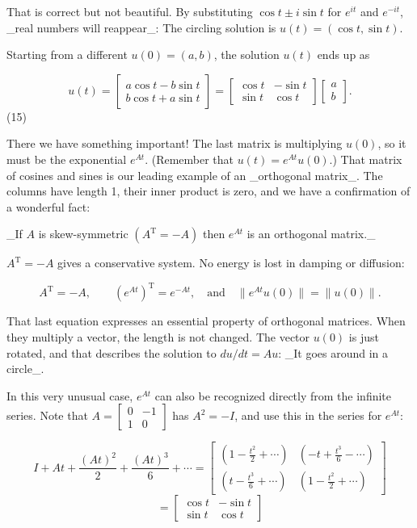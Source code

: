 That is correct but not beautiful. By substituting \(\cos t\pm i\sin t\) for \(e^{it}\) and \(e^{-it}\), _real numbers will reappear_: The circling solution is \(u(t)=(\cos t,\sin t)\).

Starting from a different \(u(0)=(a,b)\), the solution \(u(t)\) ends up as

\[u(t)=\begin{bmatrix}a\cos t-b\sin t\\ b\cos t+a\sin t\end{bmatrix}=\begin{bmatrix}\cos t&-\sin t\\ \sin t&\cos t\end{bmatrix}\begin{bmatrix}a\\ b\end{bmatrix}.\] (15)

There we have something important! The last matrix is multiplying \(u(0)\), so it must be the exponential \(e^{At}\). (Remember that \(u(t)=e^{At}u(0)\).) That matrix of cosines and sines is our leading example of an _orthogonal matrix_. The columns have length 1, their inner product is zero, and we have a confirmation of a wonderful fact:

_If \(A\) is skew-symmetric \((A^{\mathrm{T}}=-A)\) then \(e^{At}\) is an orthogonal matrix._

\(A^{\mathrm{T}}=-A\) gives a conservative system. No energy is lost in damping or diffusion:

\[A^{\mathrm{T}}=-A,\qquad(e^{At})^{\mathrm{T}}=e^{-At},\quad\text{and}\quad \|e^{At}u(0)\|=\|u(0)\|.\]

That last equation expresses an essential property of orthogonal matrices. When they multiply a vector, the length is not changed. The vector \(u(0)\) is just rotated, and that describes the solution to \(du/dt=Au\): _It goes around in a circle_.

In this very unusual case, \(e^{At}\) can also be recognized directly from the infinite series. Note that \(A=\begin{bmatrix}0&-1\\ 1&0\end{bmatrix}\) has \(A^{2}=-I\), and use this in the series for \(e^{At}\):

\[I+At+\frac{(At)^{2}}{2}+\frac{(At)^{3}}{6}+\cdots =\begin{bmatrix}\left(1-\frac{t^{2}}{2}+\cdots\right)&\left(-t+ \frac{t^{3}}{6}-\cdots\right)\\ \left(t-\frac{t^{3}}{6}+\cdots\right)&\left(1-\frac{t^{2}}{2}+\cdots\right) \end{bmatrix}\] \[=\begin{bmatrix}\cos t&-\sin t\\ \sin t&\cos t\end{bmatrix}\]

